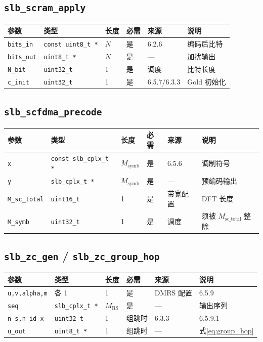 \documentclass[11pt,a4paper]{ctexart}
\begin{document}
\subsection{\texttt{slb\_scram\_apply}}

\begin{longtable}{p{2.5cm}p{2.5cm}p{1.5cm}p{1.5cm}p{2.5cm}p{4cm}}
\toprule
\textbf{参数} & \textbf{类型} & \textbf{长度} & \textbf{必需} & \textbf{来源} & \textbf{说明} \\
\midrule
\endhead
\texttt{bits\_in} & \texttt{const uint8\_t *} & $N$ & 是 & 6.2.6 & 编码后比特 \\
\texttt{bits\_out} & \texttt{uint8\_t *} & $N$ & 是 & --- & 加扰输出 \\
\texttt{N\_bit} & \texttt{uint32\_t} & 1 & 是 & 调度 & 比特长度 \\
\texttt{c\_init} & \texttt{uint32\_t} & 1 & 是 & 6.5.7/6.3.3 & Gold 初始化 \\
\bottomrule
\end{longtable}

\subsection{\texttt{slb\_scfdma\_precode}}

\begin{longtable}{p{2.5cm}p{2.5cm}p{1.5cm}p{1.5cm}p{2.5cm}p{4cm}}
\toprule
\textbf{参数} & \textbf{类型} & \textbf{长度} & \textbf{必需} & \textbf{来源} & \textbf{说明} \\
\midrule
\endhead
\texttt{x} & \texttt{const slb\_cplx\_t *} & $M_{\mathrm{symb}}$ & 是 & 6.5.6 & 调制符号 \\
\texttt{y} & \texttt{slb\_cplx\_t *} & $M_{\mathrm{symb}}$ & 是 & --- & 预编码输出 \\
\texttt{M\_sc\_total} & \texttt{uint16\_t} & 1 & 是 & 带宽配置 & DFT 长度 \\
\texttt{M\_symb} & \texttt{uint32\_t} & 1 & 是 & 调度 & 须被 $M_{\mathrm{sc\_total}}$ 整除 \\
\bottomrule
\end{longtable}

\subsection{\texttt{slb\_zc\_gen} / \texttt{slb\_zc\_group\_hop}}

\begin{longtable}{p{2.8cm}p{2.5cm}p{1.5cm}p{1.5cm}p{2.2cm}p{4cm}}
\toprule
\textbf{参数} & \textbf{类型} & \textbf{长度} & \textbf{必需} & \textbf{来源} & \textbf{说明} \\
\midrule
\endhead
\texttt{u,v,alpha,m} & 各 1 & 1 & 是 & DMRS 配置 & 6.5.9 \\
\texttt{seq} & \texttt{slb\_cplx\_t *} & $M_{\mathrm{RS}}$ & 是 & --- & 输出序列 \\
\texttt{n\_s,n\_id\_x} & \texttt{uint32\_t} & 1 & 组跳时 & 6.3.3 & 6.5.9.1 \\
\texttt{u\_out} & \texttt{uint8\_t *} & 1 & 组跳时 & --- & 式\eqref{eq:group_hop} \\
\bottomrule
\end{longtable}
\end{document}
